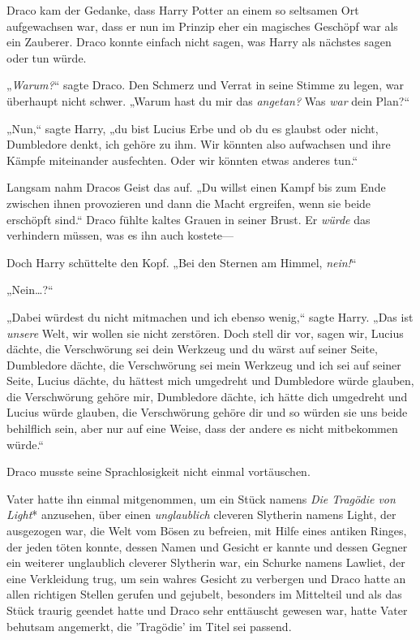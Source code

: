 {Draco kam der Gedanke, dass Harry Potter an einem so seltsamen Ort aufgewachsen war, dass er nun im Prinzip eher ein magisches Geschöpf war als ein Zauberer. Draco konnte einfach nicht sagen, was Harry als nächstes sagen oder tun würde.

„\emph{Warum?}“ sagte Draco. Den Schmerz und Verrat in seine Stimme zu legen, war überhaupt nicht schwer. „Warum hast du mir das \emph{angetan?} Was \emph{war} dein Plan?“

„Nun,“ sagte Harry, „du bist Lucius Erbe und ob du es glaubst oder nicht, Dumbledore denkt, ich gehöre zu ihm. Wir könnten also aufwachsen und ihre Kämpfe miteinander ausfechten. Oder wir könnten etwas anderes tun.“

Langsam nahm Dracos Geist das auf. „Du willst einen Kampf bis zum Ende zwischen ihnen provozieren und dann die Macht ergreifen, wenn sie beide erschöpft sind.“ Draco fühlte kaltes Grauen in seiner Brust. Er \emph{würde} das verhindern müssen, was es ihn auch kostete—

Doch Harry schüttelte den Kopf. „Bei den Sternen am Himmel, \emph{nein!}“

„Nein…?“

„Dabei würdest du nicht mitmachen und ich ebenso wenig,“ sagte Harry. „Das ist \emph{unsere} Welt, wir wollen sie nicht zerstören. Doch stell dir vor, sagen wir, Lucius dächte, die Verschwörung sei dein Werkzeug und du wärst auf seiner Seite, Dumbledore dächte, die Verschwörung sei mein Werkzeug und ich sei auf seiner Seite, Lucius dächte, du hättest mich umgedreht und Dumbledore würde glauben, die Verschwörung gehöre mir, Dumbledore dächte, ich hätte dich umgedreht und Lucius würde glauben, die Verschwörung gehöre dir und so würden sie uns beide behilflich sein, aber nur auf eine Weise, dass der andere es nicht mitbekommen würde.“

Draco musste seine Sprachlosigkeit nicht einmal vortäuschen.

Vater hatte ihn einmal mitgenommen, um ein Stück namens \emph{Die Tragödie von Light}* anzusehen, über einen \emph{unglaublich} cleveren Slytherin namens Light, der ausgezogen war, die Welt vom Bösen zu befreien, mit Hilfe eines antiken Ringes, der jeden töten konnte, dessen Namen und Gesicht er kannte und dessen Gegner ein weiterer unglaublich cleverer Slytherin war, ein Schurke namens Lawliet, der eine Verkleidung trug, um sein wahres Gesicht zu verbergen und Draco hatte an allen richtigen Stellen gerufen und gejubelt, besonders im Mittelteil und als das Stück traurig geendet hatte und Draco sehr enttäuscht gewesen war, hatte Vater behutsam angemerkt, die 'Tragödie' im Titel sei passend.

}
